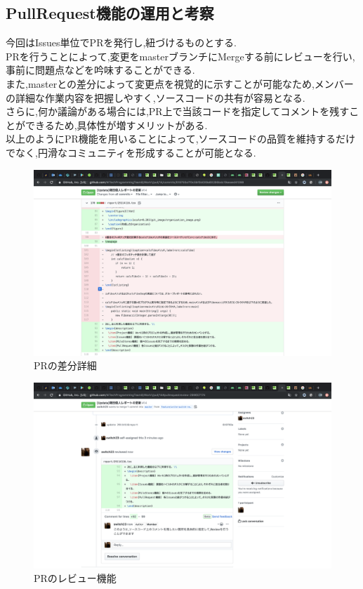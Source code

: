 ﻿\documentclass[uplatex,12pt]{jsarticle}
\begin{document}
\newpage


\subsection{PullRequest機能の運用と考察}
今回はIssues単位でPRを発行し,紐づけるものとする. \\
PRを行うことによって,変更をmasterブランチにMergeする前にレビューを行い,事前に問題点などを吟味することができる. \\
また,masterとの差分によって変更点を視覚的に示すことが可能なため,メンバーの詳細な作業内容を把握しやすく,ソースコードの共有が容易となる. \\
さらに,何か議論がある場合には,PR上で当該コードを指定してコメントを残すことができるため,具体性が増すメリットがある. \\
以上のようにPR機能を用いることによって,ソースコードの品質を維持するだけでなく,円滑なコミュニティを形成することが可能となる.

\begin{figure}[!hbt]
  \centering
  \includegraphics[scale=0.20]{git_image/pull_request_detail_image.png}
  \caption{PRの差分詳細}
\end{figure}

\begin{figure}[!hbt]
  \centering
  \includegraphics[scale=0.20]{git_image/pull_request_comment_image.png}
  \caption{PRのレビュー機能}
\end{figure}
\end{document}
